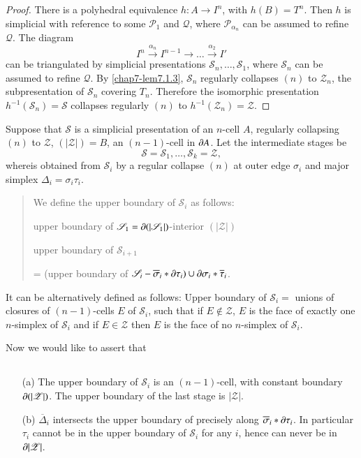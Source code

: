 \begin{proof}
There is a polyhedral equivalence $h:A\to I^{n}$, with $h(B)=T^{n}$. Then $h$ is simplicial with reference to some $\mathscr{P}_{1}$ and $\mathcal{Q}$, where $\mathscr{P}_{\alpha_{n}}$ can be assumed to refine $\mathcal{Q}$. The diagram
$$
I^{n}\xrightarrow{\alpha_{n}}I^{n-1}\to \ldots \xrightarrow{\alpha_{2}}I'
$$
can be triangulated by simplicial presentations $\mathscr{S}_{n},\ldots,\mathscr{S}_{1}$, where $\mathscr{S}_{n}$ can be assumed to refine $\mathcal{Q}$. By \ref{chap7-lem7.1.3}, $\mathscr{S}_{n}$ regularly collapses $(n)$ to $\mathscr{Z}_{n}$, the subpresentation of $\mathscr{S}_{n}$ covering $T_{n}$. Therefore the isomorphic presentation $h^{-1}(\mathscr{S}_{n})=\mathscr{S}$ collapses regularly $(n)$ to $h^{-1}(\mathscr{Z}_{n})=\mathscr{Z}$.
\end{proof}

Suppose that $\mathscr{S}$ is a simplicial presentation of an $n$-cell $A$, regularly collapsing $(n)$ to $\mathscr{Z}$, $(|\mathscr{Z}|)=B$, an $(n-1)$-cell in $\partial A$. Let the intermediate stages be
$$
\mathscr{S}=\mathscr{S}_{1},\ldots,\mathscr{S}_{k}=\mathscr{Z},
$$
where\pageoriginale is obtained from $\mathscr{S}_{i}$ by a regular collapse $(n)$ at outer edge $\sigma_{i}$ and major simplex $\Delta_{i}=\sigma_{i}\tau_{i}$.
\begin{quote}
We define the upper boundary of $\mathscr{S}_{i}$ as follows:

upper boundary of $\mathscr{S}_{1}=\partial (|\mathscr{S}_{1}|)$-interior $(|\mathscr{Z}|)$

upper boundary of $\mathscr{S}_{i+1}$

= (upper boundary of $\mathscr{S}_{i} - \overline{\sigma}_{i}\ast\partial\tau_{i})\cup \partial \sigma_{i}\ast \overline{\tau}_{i}$.
\end{quote}

It can be alternatively defined as follows: Upper boundary of $\mathscr{S}_{i}=$ unions of closures of $(n-1)$-cells $E$ of $\mathscr{S}_{i}$, such that if $E\not\in \mathscr{Z}$, $E$ is the face of exactly one $n$-simplex of $\mathscr{S}_{i}$ and if $E\in\mathscr{Z}$ then $E$ is the face of no $n$-simplex of $\mathscr{S}_{i}$.

Now we would like to assert that

\setcounter{subsection}{4}
\subsection{}\label{chap7-sec7.1.5}
\begin{itemize}
\item[(a)] The upper boundary of $\mathscr{S}_{i}$ is an $(n-1)$-cell, with constant boundary $\partial(|\mathscr{Z}|)$. The upper boundary of the last stage is $|\mathscr{Z}|$.

\item[(b)] $\overline{\Delta}_{i}$ intersects the upper boundary of precisely along $\overline{\sigma}_{i}\ast\partial\tau_{i}$. In particular $\tau_{i}$ cannot be in the upper boundary of $\mathscr{S}_{i}$ for any $i$, hence can never be in $\partial |\mathscr{Z}|$.
\end{itemize}

